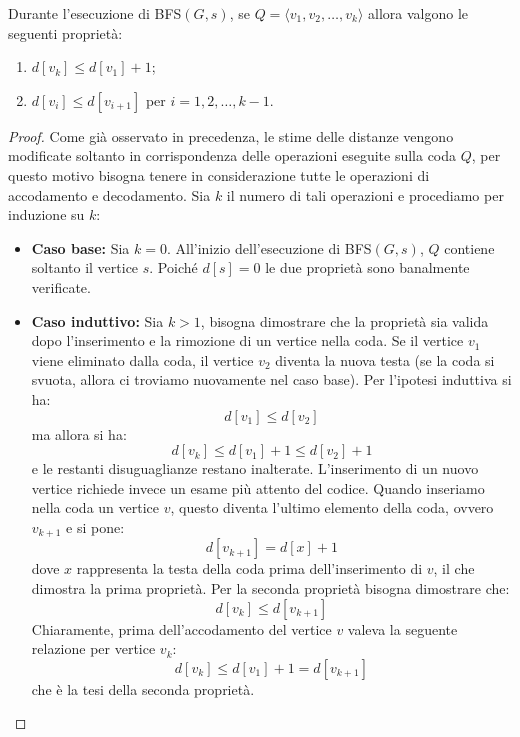 \begin{propbox}[Proprietà B]
	Durante l'esecuzione di \textsc{BFS}$(G,s)$, se $Q=\langle v_{1},v_{2},\ldots,v_{k}\rangle$ allora valgono le seguenti proprietà:
	\begin{enumerate}
		\item $d[v_{k}] \leq d[v_{1}]+1$;
		\item $d[v_{i}] \leq d[v_{i+1}]$ per $i=1,2,\ldots,k-1$.
	\end{enumerate}
\end{propbox}
\begin{proof}
	Come già osservato in precedenza, le stime delle distanze vengono modificate soltanto in corrispondenza delle operazioni eseguite sulla coda $Q$, per questo motivo bisogna tenere in considerazione tutte le operazioni di accodamento e decodamento. Sia $k$ il numero di tali operazioni e procediamo per induzione su $k$:
\begin{itemize}
	\item \textbf{Caso base:} Sia $k=0$. All'inizio dell'esecuzione di \textsc{BFS}$(G,s)$, $Q$ contiene soltanto il vertice $s$. Poiché $d[s]=0$ le due proprietà sono banalmente verificate.
	\item \textbf{Caso induttivo:} Sia $k>1$, bisogna dimostrare che la proprietà sia valida dopo l'inserimento e la rimozione di un vertice nella coda. Se il vertice $v_{1}$ viene eliminato dalla coda, il vertice $v_{2}$ diventa la nuova testa (se la coda si svuota, allora ci troviamo nuovamente nel caso base). Per l'ipotesi induttiva si ha:
	\[d[v_{1}] \leq d[v_{2}]\]
	ma allora si ha:
	\[d[v_{k}]\leq d[v_{1}]+1 \leq d[v_{2}]+1\]
	e le restanti disuguaglianze restano inalterate. L'inserimento di un nuovo vertice richiede invece un esame più attento del codice. Quando inseriamo nella coda un vertice $v$, questo diventa l'ultimo elemento della coda, ovvero $v_{k+1}$ e si pone:
	\[d[v_{k+1}] = d[x]+1\]
	dove $x$ rappresenta la testa della coda prima dell'inserimento di $v$,	il che dimostra la prima proprietà. Per la seconda proprietà bisogna dimostrare che:
	\[ d[v_{k}] \leq d[v_{k+1}] \]
	Chiaramente, prima dell'accodamento del vertice $v$ valeva la seguente relazione per vertice $v_{k}$:
	\[ d[v_{k}] \leq d[v_{1}]+1 = d[v_{k+1}] \]
	che è la tesi della seconda proprietà.
\end{itemize}
\end{proof}

